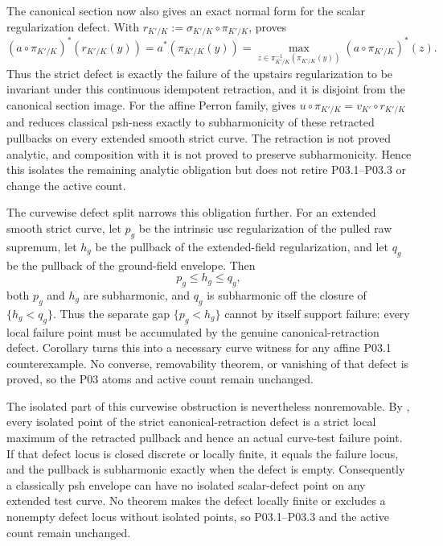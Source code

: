 The canonical section now also gives an exact normal form for the scalar
regularization defect.  With
\(r_{K'/K}:=\sigma_{K'/K}\circ\pi_{K'/K}\),
 proves
\[
 (a\circ\pi_{K'/K})^*(r_{K'/K}(y))
   =a^*(\pi_{K'/K}(y))
   =\max_{z\in\pi_{K'/K}^{-1}(\pi_{K'/K}(y))}
                    (a\circ\pi_{K'/K})^*(z).
\]
Thus the strict defect is exactly the failure of the upstairs regularization
to be invariant under this continuous idempotent retraction, and it is
disjoint from the canonical section image.  For the affine Perron family,
 gives
\(u\circ\pi_{K'/K}=v_{K'}\circ r_{K'/K}\) and reduces classical psh-ness
exactly to subharmonicity of these retracted pullbacks on every extended
smooth strict curve.  The retraction is not proved analytic, and composition
with it is not proved to preserve subharmonicity.  Hence this isolates the
remaining analytic obligation but does not retire P03.1--P03.3 or change the
active count.

The curvewise defect split
 narrows this obligation
further.  For an extended smooth strict curve, let \(p_g\) be the intrinsic
usc regularization of the pulled raw supremum, let \(h_g\) be the pullback of
the extended-field regularization, and let \(q_g\) be the pullback of the
ground-field envelope.  Then
\[
                         p_g\leq h_g\leq q_g,
\]
both \(p_g\) and \(h_g\) are subharmonic, and \(q_g\) is subharmonic off the
closure of \(\{h_g<q_g\}\).  Thus the separate gap \(\{p_g<h_g\}\) cannot by
itself support failure: every local failure point must be accumulated by
the genuine canonical-retraction defect.  Corollary
 turns this into a necessary
curve witness for any affine P03.1 counterexample.  No converse,
removability theorem, or vanishing of that defect is proved, so the P03
atoms and active count remain unchanged.

The isolated part of this curvewise obstruction is nevertheless
nonremovable.  By
, every isolated point
of the strict canonical-retraction defect is a strict local maximum of the
retracted pullback and hence an actual curve-test failure point.  If that
defect locus is closed discrete or locally finite, it equals the failure
locus, and the pullback is subharmonic exactly when the defect is empty.
Consequently a classically psh envelope can have no isolated scalar-defect
point on any extended test curve.  No theorem makes the defect locally
finite or excludes a nonempty defect locus without isolated points, so
P03.1--P03.3 and the active count remain unchanged.

